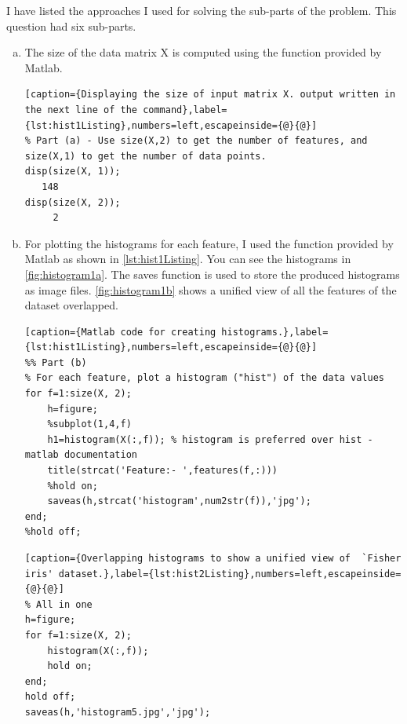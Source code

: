 \documentclass[a4paper, 11pt]{article}
\begin{document}
I have listed the approaches I used for solving the sub-parts of the problem. This question had six sub-parts.
\begin{enumerate}[(a)]
\item The size of the data matrix X is computed using the  function provided by Matlab.
\vspace{-30pt}
\begin{lstlisting}[caption={Displaying the size of input matrix X. output written in the next line of the command},label={lst:hist1Listing},numbers=left,escapeinside={@}{@}]
% Part (a) - Use size(X,2) to get the number of features, and size(X,1) to get the number of data points.
disp(size(X, 1));
   148
disp(size(X, 2));
     2
\end{lstlisting}

\item For plotting the histograms for each feature, I used the  function provided by Matlab as shown in \autoref{lst:hist1Listing}. You can see the histograms in \autoref{fig:histogram1a}. The saves function is used to store the produced histograms as image files. \autoref{fig:histogram1b} shows a unified view of all the features of the dataset overlapped.
\vspace{-20pt}
\begin{lstlisting}[caption={Matlab code for creating histograms.},label={lst:hist1Listing},numbers=left,escapeinside={@}{@}]
%% Part (b)
% For each feature, plot a histogram ("hist") of the data values
for f=1:size(X, 2);
    h=figure;
    %subplot(1,4,f)
    h1=histogram(X(:,f)); % histogram is preferred over hist - matlab documentation
    title(strcat('Feature:- ',features(f,:)))
    %hold on;
    saveas(h,strcat('histogram',num2str(f)),'jpg');
end;
%hold off;
\end{lstlisting}
\vspace{-20pt}
\begin{lstlisting}[caption={Overlapping histograms to show a unified view of  `Fisher iris' dataset.},label={lst:hist2Listing},numbers=left,escapeinside={@}{@}]
% All in one
h=figure;
for f=1:size(X, 2);
    histogram(X(:,f));
    hold on;
end;
hold off;
saveas(h,'histogram5.jpg','jpg');
\end{lstlisting}


\end{enumerate}
\end{document}
